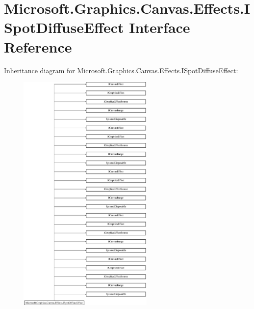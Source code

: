 \hypertarget{interface_microsoft_1_1_graphics_1_1_canvas_1_1_effects_1_1_i_spot_diffuse_effect}{}\section{Microsoft.\+Graphics.\+Canvas.\+Effects.\+I\+Spot\+Diffuse\+Effect Interface Reference}
\label{interface_microsoft_1_1_graphics_1_1_canvas_1_1_effects_1_1_i_spot_diffuse_effect}
Inheritance diagram for Microsoft.\+Graphics.\+Canvas.\+Effects.\+I\+Spot\+Diffuse\+Effect\+:\begin{figure}[H]
\begin{center}
\leavevmode
\includegraphics[height=12.000000cm]{interface_microsoft_1_1_graphics_1_1_canvas_1_1_effects_1_1_i_spot_diffuse_effect}
\end{center}
\end{figure}

